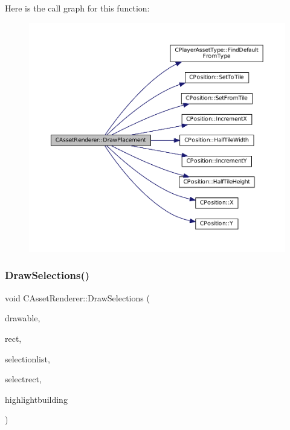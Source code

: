 Here is the call graph for this function\+:\nopagebreak
\begin{figure}[H]
\begin{center}
\leavevmode
\includegraphics[width=350pt]{classCAssetRenderer_af9cdf65db6c87c8cfd94fc4a84066b3e_cgraph}
\end{center}
\end{figure}
\hypertarget{classCAssetRenderer_ad9e2ab45919abbec23871b85a95ba8cf}{}\label{classCAssetRenderer_ad9e2ab45919abbec23871b85a95ba8cf} 
\subsubsection{\texorpdfstring{Draw\+Selections()}{DrawSelections()}}
{\footnotesize\ttfamily void C\+Asset\+Renderer\+::\+Draw\+Selections (\begin{DoxyParamCaption}\item[{Gdk\+Drawable $\ast$}]{drawable,  }\item[{const \hyperlink{structSRectangle}{S\+Rectangle} \&}]{rect,  }\item[{const std\+::list$<$ std\+::weak\+\_\+ptr$<$ \hyperlink{classCPlayerAsset}{C\+Player\+Asset} $>$ $>$ \&}]{selectionlist,  }\item[{const \hyperlink{structSRectangle}{S\+Rectangle} \&}]{selectrect,  }\item[{bool}]{highlightbuilding }\end{DoxyParamCaption})}




